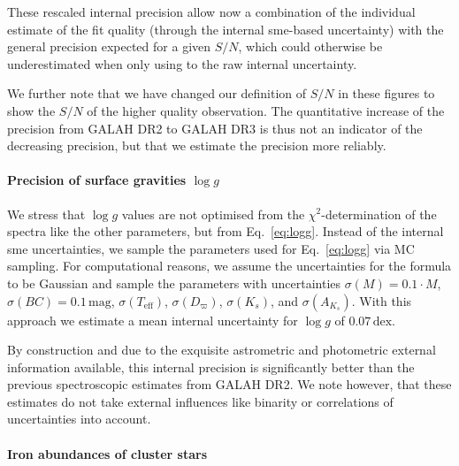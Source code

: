 \documentclass[fleqn,usenatbib,useAMS]{mnras}
\newcommand{\logg}{$\log g$\xspace}
\begin{document}
These rescaled internal precision allow now a combination of the individual estimate of the fit quality (through the internal {\sc sme}-based uncertainty) with the general precision expected for a given $S/N$, which could otherwise be underestimated when only using to the raw internal uncertainty. 

We further note that we have changed our definition of $S/N$ in these figures to show the $S/N$ of the higher quality observation. The quantitative increase of the precision from GALAH DR2 to GALAH DR3 is thus not an indicator of the decreasing precision, but that we estimate the precision more reliably.

\paragraph*{Precision of surface gravities \logg}

We stress that $\log g$ values are not optimised from the $\chi^2$-determination of the spectra like the other parameters, but from Eq.~\ref{eq:logg}. Instead of the internal {\sc sme} uncertainties, we sample the parameters used for Eq.~\ref{eq:logg} via MC sampling. For computational reasons, we assume the uncertainties for the formula to be Gaussian and sample the parameters with uncertainties $\sigma (M) = 0.1\cdot M$, $\sigma (BC) = 0.1\,\mathrm{mag}$, $\sigma (T_\text{eff})$, $\sigma (D_\varpi)$, $\sigma (K_s)$, and $\sigma (A_{K_s})$. With this approach we estimate a mean internal uncertainty for \logg of $0.07\,\mathrm{dex}$.

By construction and due to the exquisite astrometric and photometric external information available, this internal precision is significantly better than the previous spectroscopic estimates from GALAH DR2. We note however, that these estimates do not take external influences like binarity or correlations of uncertainties into account.

\paragraph*{Iron abundances of cluster stars}
\end{document}
